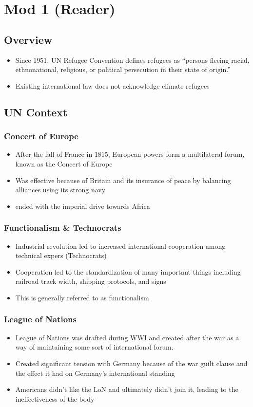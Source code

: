 \documentclass[11pt]{article}
\author{Sudhan Chitgopkar}
\date{\today}
\title{}
\begin{document}
\tableofcontents \clearpage\section{Mod 1 (Reader)}
\label{sec:org43e9a5b}
\subsection{Overview}
\label{sec:org2518b4d}
\begin{itemize}
\item Since 1951, UN Refugee Convention defines refugees as ``persons fleeing racial, ethnonational, religious, or political persecution in their state of origin.''
\item Existing international law does not acknowledge climate refugees
\end{itemize}
\subsection{UN Context}
\label{sec:org506ed33}
\subsubsection{Concert of Europe}
\label{sec:orga3db9cb}
\begin{itemize}
\item After the fall of France in 1815, European powers form a multilateral forum, known as the Concert of Europe
\item Was effective because of Britain and its insurance of peace by balancing alliances using its strong navy
\item ended with the imperial drive towards Africa
\end{itemize}
\subsubsection{Functionalism \& Technocrats}
\label{sec:org57651dc}
\begin{itemize}
\item Industrial revolution led to increased international cooperation among technical expers (Technocrats)
\item Cooperation led to the standardization of many important things including railroad track width, shipping protocols, and signs
\item This is generally referred to as functionalism
\end{itemize}
\subsubsection{League of Nations}
\label{sec:orgc80765f}
\begin{itemize}
\item League of Nations was drafted during WWI and created after the war as a way of maintaining some sort of international forum.
\item Created significant tension with Germany because of the war guilt clause and the effect it had on Germany's international standing
\item Americans didn't like the LoN and ultimately didn't join it, leading to the ineffectiveness of the body
\end{itemize}
\end{document}

